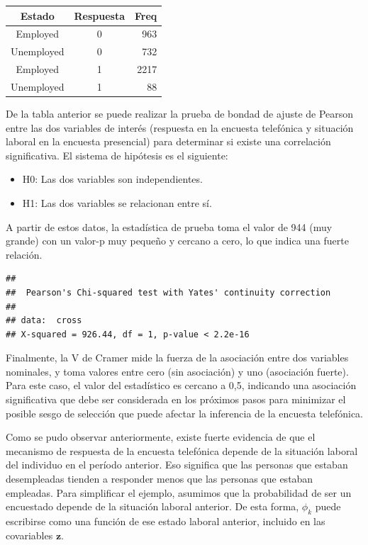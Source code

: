\documentclass[
  12pt,
  spanish,
]{book}
\providecommand{\tightlist}{%
  \setlength{\itemsep}{0pt}\setlength{\parskip}{0pt}}
\begin{document}
\captionsetup[table]{labelformat=empty,skip=1pt}
\begin{longtable}{ccr}
\toprule
Estado & Respuesta & Freq \\ 
\midrule
Employed & 0 & 963 \\ 
Unemployed & 0 & 732 \\ 
Employed & 1 & 2217 \\ 
Unemployed & 1 & 88 \\ 
 \bottomrule
\end{longtable}

De la tabla anterior se puede realizar la prueba de bondad de ajuste de Pearson entre las dos variables de interés (respuesta en la encuesta telefónica y situación laboral en la encuesta presencial) para determinar si existe una correlación significativa. El sistema de hipótesis es el siguiente:

\begin{itemize}
\tightlist
\item
  H0: Las dos variables son independientes.
\item
  H1: Las dos variables se relacionan entre sí.
\end{itemize}

A partir de estos datos, la estadística de prueba toma el valor de 944 (muy grande) con un valor-p muy pequeño y cercano a cero, lo que indica una fuerte relación.

\begin{verbatim}
## 
##  Pearson's Chi-squared test with Yates' continuity correction
## 
## data:  cross
## X-squared = 926.44, df = 1, p-value < 2.2e-16
\end{verbatim}

Finalmente, la V de Cramer mide la fuerza de la asociación entre dos variables nominales, y toma valores entre cero (sin asociación) y uno (asociación fuerte). Para este caso, el valor del estadístico es cercano a 0,5, indicando una asociación significativa que debe ser considerada en los próximos pasos para minimizar el posible sesgo de selección que puede afectar la inferencia de la encuesta telefónica.

Como se pudo observar anteriormente, existe fuerte evidencia de que el mecanismo de respuesta de la encuesta telefónica depende de la situación laboral del individuo en el período anterior. Eso significa que las personas que estaban desempleadas tienden a responder menos que las personas que estaban empleadas. Para simplificar el ejemplo, asumimos que la probabilidad de ser un encuestado depende de la situación laboral anterior. De esta forma, \(\phi_k\) puede escribirse como una función de ese estado laboral anterior, incluido en las covariables \(\mathbf{z}\).
\end{document}

